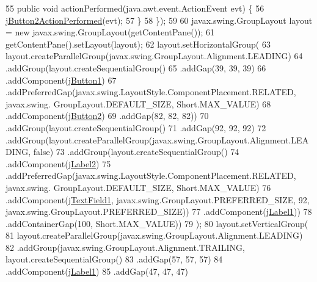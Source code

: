 \begin{DoxyCode}
55             \textcolor{keyword}{public} \textcolor{keywordtype}{void} actionPerformed(java.awt.event.ActionEvent evt) \{
56                 \mbox{\hyperlink{class_interfaz_package_1_1_baja_lector_a68ce955ddab00f21a3fe2f7aa43f098d}{jButton2ActionPerformed}}(evt);
57             \}
58         \});
59 
60         javax.swing.GroupLayout layout = \textcolor{keyword}{new} javax.swing.GroupLayout(getContentPane());
61         getContentPane().setLayout(layout);
62         layout.setHorizontalGroup(
63             layout.createParallelGroup(javax.swing.GroupLayout.Alignment.LEADING)
64             .addGroup(layout.createSequentialGroup()
65                 .addGap(39, 39, 39)
66                 .addComponent(\mbox{\hyperlink{class_interfaz_package_1_1_baja_lector_ac8cdd8217744e010d4f23c911fafda3e}{jButton1}})
67                 .addPreferredGap(javax.swing.LayoutStyle.ComponentPlacement.RELATED, javax.swing.
      GroupLayout.DEFAULT\_SIZE, Short.MAX\_VALUE)
68                 .addComponent(\mbox{\hyperlink{class_interfaz_package_1_1_baja_lector_aea778ac52e2bd99213ebd7e1c1d23e09}{jButton2}})
69                 .addGap(82, 82, 82))
70             .addGroup(layout.createSequentialGroup()
71                 .addGap(92, 92, 92)
72                 .addGroup(layout.createParallelGroup(javax.swing.GroupLayout.Alignment.LEADING, \textcolor{keyword}{false})
73                     .addGroup(layout.createSequentialGroup()
74                         .addComponent(\mbox{\hyperlink{class_interfaz_package_1_1_baja_lector_a9b41f7f44ecf39652a7f7938173d29c5}{jLabel2}})
75                         .addPreferredGap(javax.swing.LayoutStyle.ComponentPlacement.RELATED, javax.swing.
      GroupLayout.DEFAULT\_SIZE, Short.MAX\_VALUE)
76                         .addComponent(\mbox{\hyperlink{class_interfaz_package_1_1_baja_lector_a7a476ef16a2314a268fb7e53e32cdd31}{jTextField1}}, javax.swing.GroupLayout.PREFERRED\_SIZE, 92, 
      javax.swing.GroupLayout.PREFERRED\_SIZE))
77                     .addComponent(\mbox{\hyperlink{class_interfaz_package_1_1_baja_lector_aa981bd8695b99b2bfaf0d7af80e1475b}{jLabel1}}))
78                 .addContainerGap(100, Short.MAX\_VALUE))
79         );
80         layout.setVerticalGroup(
81             layout.createParallelGroup(javax.swing.GroupLayout.Alignment.LEADING)
82             .addGroup(javax.swing.GroupLayout.Alignment.TRAILING, layout.createSequentialGroup()
83                 .addGap(57, 57, 57)
84                 .addComponent(\mbox{\hyperlink{class_interfaz_package_1_1_baja_lector_aa981bd8695b99b2bfaf0d7af80e1475b}{jLabel1}})
85                 .addGap(47, 47, 47)

\end{DoxyCode}
